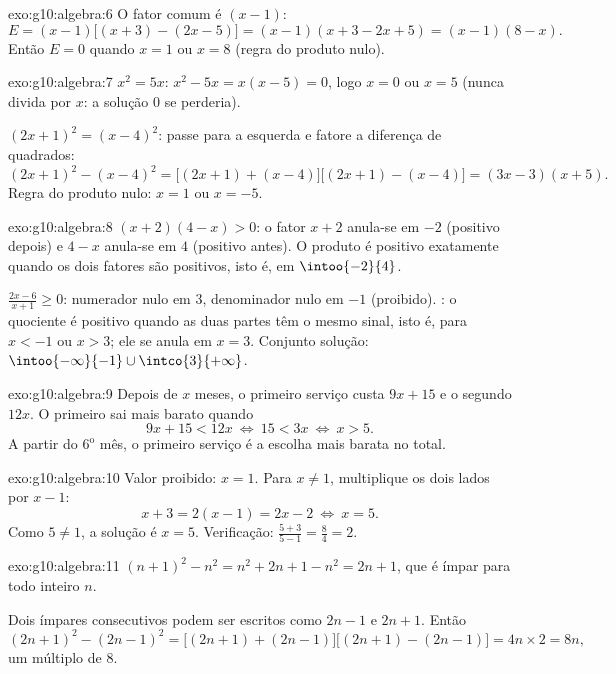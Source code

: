\begin{solution}{exo:g10:algebra:6}
O fator comum é $(x-1)$:
\[
E = (x-1)\bigl[(x+3) - (2x - 5)\bigr] = (x-1)(x + 3 - 2x + 5)
= (x-1)(8 - x).
\]
Então $E = 0$ quando $x = 1$ ou $x = 8$ (regra do produto nulo).
\end{solution}

\begin{solution}{exo:g10:algebra:7}
$x^2 = 5x$: $x^2 - 5x = x(x - 5) = 0$, logo $x = 0$ ou $x = 5$ (nunca
divida por $x$: a solução $0$ se perderia).

$(2x+1)^2 = (x-4)^2$: passe para a esquerda e fatore a diferença de
quadrados:
\[
(2x+1)^2 - (x-4)^2
= \bigl[(2x+1) + (x-4)\bigr]\bigl[(2x+1) - (x-4)\bigr]
= (3x - 3)(x + 5).
\]
Regra do produto nulo: $x = 1$ ou $x = -5$.
\end{solution}

\begin{solution}{exo:g10:algebra:8}
$(x+2)(4-x) > 0$: o fator $x + 2$ anula-se em $-2$ (positivo depois) e
$4 - x$ anula-se em $4$ (positivo antes). O produto é positivo
exatamente quando os dois fatores são positivos, isto é, em
$\intoo{-2}{4}$.

$\frac{2x-6}{x+1} \geq 0$: numerador nulo em $3$, denominador nulo em
$-1$ (proibido). : o quociente é positivo quando as duas
partes têm o mesmo sinal, isto é, para $x < -1$ ou $x > 3$; ele se anula
em $x = 3$. Conjunto solução: $\intoo{-\infty}{-1} \cup
\intco{3}{+\infty}$.
\end{solution}

\begin{solution}{exo:g10:algebra:9}
Depois de $x$ meses, o primeiro serviço custa $9x + 15$ e o segundo
$12x$. O primeiro sai mais barato quando
\[
9x + 15 < 12x
\ \Longleftrightarrow\
15 < 3x
\ \Longleftrightarrow\
x > 5 .
\]
A partir do $6^{\text{o}}$ mês, o primeiro serviço é a escolha mais
barata no total.
\end{solution}

\begin{solution}{exo:g10:algebra:10}
Valor proibido: $x = 1$. Para $x \neq 1$, multiplique os dois lados por
$x - 1$:
\[
x + 3 = 2(x - 1) = 2x - 2
\ \Longleftrightarrow\
x = 5 .
\]
Como $5 \neq 1$, a solução é $x = 5$. Verificação:
$\frac{5+3}{5-1} = \frac84 = 2$.
\end{solution}

\begin{solution}{exo:g10:algebra:11}
$(n+1)^2 - n^2 = n^2 + 2n + 1 - n^2 = 2n + 1$, que é ímpar para todo
inteiro $n$.

Dois ímpares consecutivos podem ser escritos como $2n - 1$ e $2n + 1$.
Então
\[
(2n+1)^2 - (2n-1)^2
= \bigl[(2n+1)+(2n-1)\bigr]\bigl[(2n+1)-(2n-1)\bigr]
= 4n \times 2 = 8n,
\]
um múltiplo de $8$.
\end{solution}

